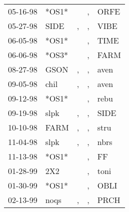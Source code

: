 \begin{supertabular}{p{0.07\textwidth}p{0.06\textwidth}p{0.02\textwidth}p{0.02\textwidth}p{0.06\textwidth}}
          05-16-98\textsuperscript{} &                            *OS1* &                  &                , &           ORFE\textsuperscript{} \\
          05-27-98\textsuperscript{} &           SIDE\textsuperscript{} &                , &                , &           VIBE\textsuperscript{} \\
          06-05-98\textsuperscript{} &                            *OS1* &                  &                , &           TIME\textsuperscript{} \\
          06-06-98\textsuperscript{} &                            *OS3* &                  &                , &           FARM\textsuperscript{} \\
          08-27-98\textsuperscript{} &           GSON\textsuperscript{} &                , &                , &           aven\textsuperscript{} \\
          09-05-98\textsuperscript{} &           chil\textsuperscript{} &                , &                , &           aven\textsuperscript{} \\
          09-12-98\textsuperscript{} &                            *OS1* &                  &                , &           rebu\textsuperscript{} \\
          09-19-98\textsuperscript{} &           slpk\textsuperscript{} &                , &                , &           SIDE\textsuperscript{} \\
          10-10-98\textsuperscript{} &           FARM\textsuperscript{} &                , &                , &           stru\textsuperscript{} \\
          11-04-98\textsuperscript{} &           slpk\textsuperscript{} &                , &                , &           nbrs\textsuperscript{} \\
          11-13-98\textsuperscript{} &                            *OS1* &                  &                , &             FF\textsuperscript{} \\
          01-28-99\textsuperscript{} &            2X2\textsuperscript{} &                  &                , &           toni\textsuperscript{} \\
          01-30-99\textsuperscript{} &                            *OS1* &                  &                , &           OBLI\textsuperscript{} \\
          02-13-99\textsuperscript{} &           noqs\textsuperscript{} &                , &                , &           PRCH\textsuperscript{} \\

\end{supertabular}
